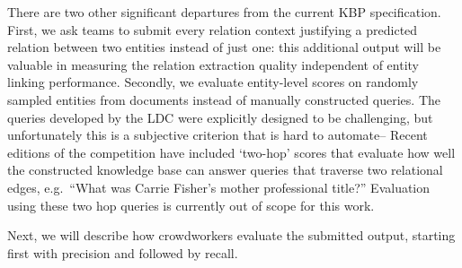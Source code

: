 There are two other significant departures from the current KBP specification.
First, we ask teams to submit every relation context justifying a predicted relation between two entities instead of just one:
  this additional output will be valuable in measuring the relation extraction quality independent of entity linking performance.
Secondly, we evaluate entity-level scores on randomly sampled entities from documents instead of manually constructed queries.
The queries developed by the LDC were explicitly designed to be challenging, but unfortunately this is a subjective criterion that is hard to automate-- 
Recent editions of the competition have included `two-hop' scores that evaluate how well the constructed knowledge base can answer queries that traverse two relational edges, e.g.\ ``What was Carrie Fisher's mother professional title?''
Evaluation using these two hop queries is currently out of scope for this work.

Next, we will describe how crowdworkers evaluate the submitted output, starting first with precision and followed by recall.

